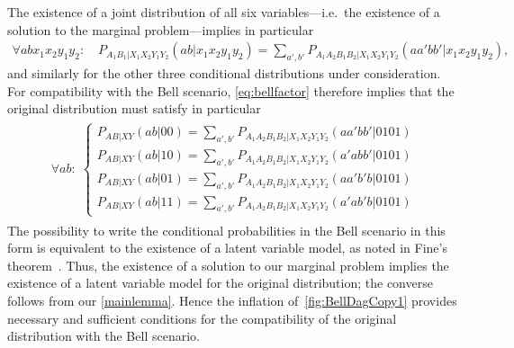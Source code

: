 \documentclass[aps,english,10pt,superscriptaddress,onecolumn,twoside,longbibliography,pra,floatfix,fleqn,nofootinbib]{revtex4-1}
\theoremstyle{definition}
\begin{document}
The existence of a joint distribution of all six variables---i.e.~the existence of a solution to the marginal problem---implies in particular
\begin{align}
	\forall{a b x_1 x_2 y_1 y_2}: \quad P_{A_1 B_1 | X_1 X_2 Y_1 Y_2}(a b | x_1 x_2 y_1 y_2)  =  \sum\nolimits_{a',b'} P_{A_1 A_2 B_1 B_2 | X_1 X_2 Y_1 Y_2}(a a' b b'|x_1 x_2 y_1 y_2),
\end{align}
and similarly for the other three conditional distributions under consideration. For compatibility with the Bell scenario, \cref{eq:bellfactor} therefore implies that the original distribution must satisfy in particular
\begin{align}\begin{split}\label{eq:finalBellstep}\forall{a b}:\; \begin{cases}
	P_{A B | X Y}(a b | 0 0)  =  \sum\nolimits_{a',b'} P_{A_1 A_2 B_1 B_2| X_1 X_2 Y_1 Y_2}(a a' b b'|0101) \\
	P_{A B | X Y}(a b | 1 0)  =  \sum\nolimits_{a',b'} P_{A_1 A_2 B_1 B_2| X_1 X_2 Y_1 Y_2}(a' a b b'|0101) \\
	P_{A B | X Y}(a b | 0 1)  =  \sum\nolimits_{a',b'} P_{A_1 A_2 B_1 B_2| X_1 X_2 Y_1 Y_2}(a a' b' b|0101) \\
	P_{A B | X Y}(a b | 1 1)  =  \sum\nolimits_{a',b'} P_{A_1 A_2 B_1 B_2| X_1 X_2 Y_1 Y_2}(a' a b' b|0101)
\end{cases}\end{split}\end{align}
The possibility to write the conditional probabilities in the Bell scenario in this form is equivalent to the existence of a latent variable model, as noted in Fine's theorem~\cite{FineTheorem}. Thus, the existence of a solution to our marginal problem implies the existence of a latent variable model for the original distribution; the converse follows from our \cref{mainlemma}. Hence the inflation of~\cref{fig:BellDagCopy1} provides necessary and sufficient conditions for the compatibility of the original distribution with the Bell scenario.
\end{document}
